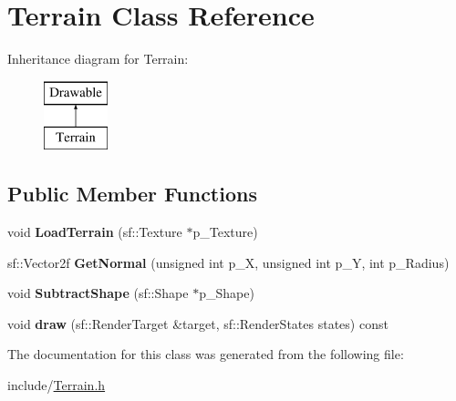 \hypertarget{class_terrain}{}\section{Terrain Class Reference}
\label{class_terrain}
Inheritance diagram for Terrain\+:\begin{figure}[H]
\begin{center}
\leavevmode
\includegraphics[height=2.000000cm]{class_terrain}
\end{center}
\end{figure}
\subsection*{Public Member Functions}
\begin{DoxyCompactItemize}
\item 
\mbox{\label{class_terrain_ab42c4af61b057ccc1af4f2ebbfefa550}} 
void {\bfseries Load\+Terrain} (sf\+::\+Texture $\ast$p\+\_\+\+Texture)
\item 
\mbox{\label{class_terrain_a728b4b72b41aaf1ed463652737b81b37}} 
sf\+::\+Vector2f {\bfseries Get\+Normal} (unsigned int p\+\_\+X, unsigned int p\+\_\+Y, int p\+\_\+\+Radius)
\item 
\mbox{\label{class_terrain_a1929db8af46f2b4a1a053ac33b495bb1}} 
void {\bfseries Subtract\+Shape} (sf\+::\+Shape $\ast$p\+\_\+\+Shape)
\item 
\mbox{\label{class_terrain_a46d26ac3525b10ca6bbf065b2627c2b6}} 
void {\bfseries draw} (sf\+::\+Render\+Target \&target, sf\+::\+Render\+States states) const
\end{DoxyCompactItemize}


The documentation for this class was generated from the following file\+:\begin{DoxyCompactItemize}
\item 
include/\hyperlink{_terrain_8h}{Terrain.\+h}\end{DoxyCompactItemize}

